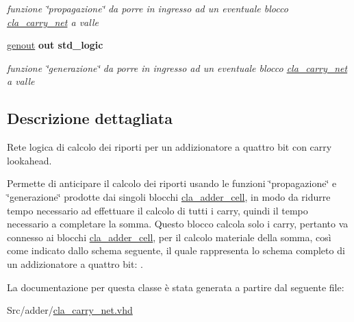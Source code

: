 \begin{DoxyCompactItemize}
\begin{DoxyCompactList}\small\item\em funzione \char`\"{}propagazione\char`\"{} da porre in ingresso ad un eventuale blocco \hyperlink{classcla__carry__net}{cla\+\_\+carry\+\_\+net} a valle \end{DoxyCompactList}\item 
\hyperlink{group___carry_network_ga068cd5c4d23e284cb942702252ed1491}{genout}  {\bfseries {\bfseries \textcolor{vhdlchar}{out}\textcolor{vhdlchar}{ }}} {\bfseries \textcolor{vhdlchar}{std\+\_\+logic}\textcolor{vhdlchar}{ }} 
\begin{DoxyCompactList}\small\item\em funzione \char`\"{}generazione\char`\"{} da porre in ingresso ad un eventuale blocco \hyperlink{classcla__carry__net}{cla\+\_\+carry\+\_\+net} a valle \end{DoxyCompactList}\end{DoxyCompactItemize}


\subsection{Descrizione dettagliata}
Rete logica di calcolo dei riporti per un addizionatore a quattro bit con carry lookahead.

Permette di anticipare il calcolo dei riporti usando le funzioni \char`\"{}propagazione\char`\"{} e \char`\"{}generazione\char`\"{} prodotte dai singoli blocchi \hyperlink{classcla__adder__cell}{cla\+\_\+adder\+\_\+cell}, in modo da ridurre tempo necessario ad effettuare il calcolo di tutti i carry, quindi il tempo necessario a completare la somma. Questo blocco calcola solo i carry, pertanto va connesso ai blocchi \hyperlink{classcla__adder__cell}{cla\+\_\+adder\+\_\+cell}, per il calcolo materiale della somma, così come indicato dallo schema seguente, il quale rappresenta lo schema completo di un addizionatore a quattro bit\+: . 

La documentazione per questa classe è stata generata a partire dal seguente file\+:\begin{DoxyCompactItemize}
\item 
Src/adder/\hyperlink{cla__carry__net_8vhd}{cla\+\_\+carry\+\_\+net.\+vhd}\end{DoxyCompactItemize}
